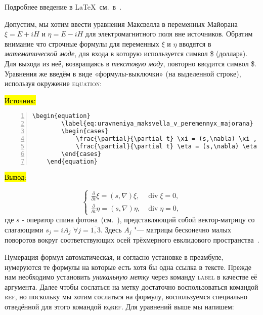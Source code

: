 Подробнее введение в \LaTeX\ см.~в~\cite{nasyrov:book:2019:01}.

Допустим, мы хотим ввести уравнения Максвелла в переменных Майорана \\ $\xi = E + i H$ и $\eta = E - i H$ для электромагнитного поля вне источников. Обратим внимание что строчные формулы для переменных $\xi$ и $\eta$ вводятся в {\itshape математической моде}, для входа в которую используется символ \$ (доллара). Для выхода из неё, возвращаясь в {\itshape текстовую моду}, повторно вводится символ \$. Уравнения же введём в виде «формулы-выключки» (на выделенной строке), используя окружение \textsc{equation}:

\hl{Источник:}

\begin{Verbatim}[frame = single, label = {Пример окружения \textsc{equation}}, fontfamily = courier, tabsize = 3, numbers = left, gobble=1]
	\begin{equation}
		\label{eq:uravneniya_maksvella_v_peremennyx_majorana}
		\begin{cases}
			\frac{\partial}{\partial t} \xi = (s,\nabla) \xi , & \operatorname{div} \xi = 0 , \\
			\frac{\partial}{\partial t} \eta = (s,\nabla) \eta , & \operatorname{div} \eta = 0 ,
		\end{cases}
	\end{equation}
\end{Verbatim}

\hl{Вывод:}

\begin{equation}
	\label{eq:uravneniya_maksvella_v_peremennyx_majorana}
	\begin{cases}
		\frac{\partial}{\partial t} \xi = (s,\nabla) \xi , & \operatorname{div} \xi = 0 , \\
		\frac{\partial}{\partial t} \eta = (s,\nabla) \eta , & \operatorname{div} \eta = 0 ,
	\end{cases}
\end{equation}
где $s$ - оператор спина фотона~(см.~\cite{axiezer:book:1981:01}), представляющий собой вектор-матрицу со слагающими $s_{j} = i A_{j}$ $\forall j =\overline{1,3}$. Здесь $A_{j}$ "--- матрицы бесконечно малых поворотов вокруг соответствующих осей трёхмерного евклидового пространства~\cite{gelfand:book:1972:09}.

Нумерация формул автоматическая, и согласно установке в преамбуле, нумеруются те формулы на которые есть хотя бы одна ссылка в тексте. Прежде нам необходимо установить \textit{уникальную метку} через команду \textsc{label} в качестве её аргумента. Далее чтобы сослаться на метку достаточно воспользоваться командой \textsc{ref}, но поскольку мы хотим сослаться на формулу, воспользуемся специально отведённой для этого командой \textsc{eqref}. Для уравнений выше мы напишем:

